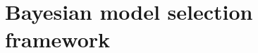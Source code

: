 \documentclass{article}
\newcommand{\ndg}[1]{\textcolor{Green}{[ndg: #1]}}
\begin{document}



\section{Bayesian model selection framework}
\label{s:bayes}
\end{document}
